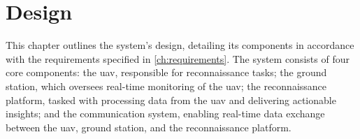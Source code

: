 \chapter{Design}\label{ch:design}

This chapter outlines the system's design, detailing its components in accordance with the requirements specified in \cref{ch:requirements}. The system consists of four core components: the \gls{uav}, responsible for reconnaissance tasks; the ground station, which oversees real-time monitoring of the \gls{uav}; the reconnaissance platform, tasked with processing data from the \gls{uav} and delivering actionable insights; and the communication system, enabling real-time data exchange between the \gls{uav}, ground station, and the reconnaissance platform.





